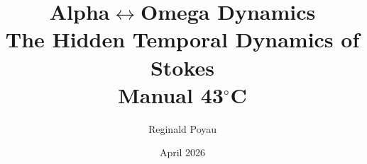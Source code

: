 \title{Alpha$\leftrightarrow$Omega Dynamics\\
\large The Hidden Temporal Dynamics of Stokes\\
\Large Manual 43$^\circ$C}
\author{Reginald Poyau}
\date{April 2026}
\maketitle
